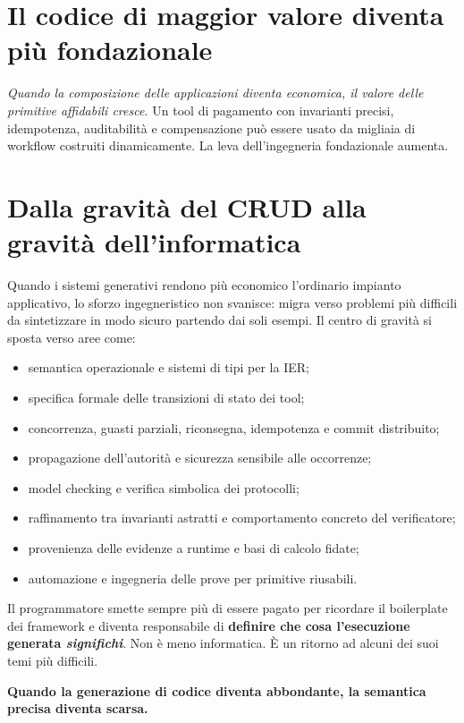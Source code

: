\documentclass[10pt,oneside,openany]{book}
\begin{document}
\section{Il codice di maggior valore diventa più fondazionale}
\emph{Quando la composizione delle applicazioni diventa economica, il valore delle primitive affidabili cresce.} Un tool di pagamento con invarianti precisi, idempotenza, auditabilità e compensazione può essere usato da migliaia di workflow costruiti dinamicamente. La leva dell'ingegneria fondazionale aumenta.


\section{Dalla gravità del CRUD alla gravità dell'informatica}
Quando i sistemi generativi rendono più economico l'ordinario impianto applicativo, lo sforzo ingegneristico non svanisce: migra verso problemi più difficili da sintetizzare in modo sicuro partendo dai soli esempi. Il centro di gravità si sposta verso aree come:

\begin{itemize}
\item semantica operazionale e sistemi di tipi per la IER;
\item specifica formale delle transizioni di stato dei tool;
\item concorrenza, guasti parziali, riconsegna, idempotenza e commit distribuito;
\item propagazione dell'autorità e sicurezza sensibile alle occorrenze;
\item model checking e verifica simbolica dei protocolli;
\item raffinamento tra invarianti astratti e comportamento concreto del verificatore;
\item provenienza delle evidenze a runtime e basi di calcolo fidate;
\item automazione e ingegneria delle prove per primitive riusabili.
\end{itemize}

Il programmatore smette sempre più di essere pagato per ricordare il boilerplate dei framework e diventa responsabile di \textbf{definire che cosa l'esecuzione generata \emph{significhi}}. Non è meno informatica. È un ritorno ad alcuni dei suoi temi più difficili.

\begin{center}
\sffamily\bfseries
Quando la generazione di codice diventa abbondante, la semantica precisa diventa scarsa.
\end{center}
\end{document}
